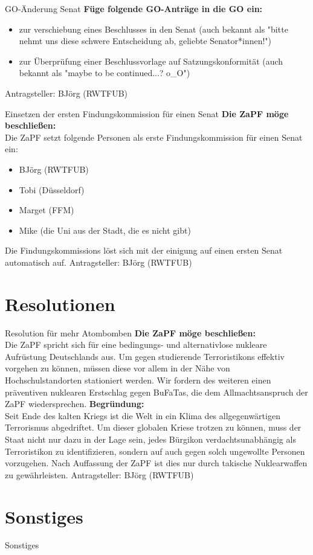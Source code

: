 \documentclass[compress,aspectratio=169]{beamer}
\begin{document}
\begin{frame}{GO-Änderung Senat}
	\textbf{Füge folgende GO-Anträge in die GO ein:}\\
	\begin{itemize}
		\item zur verschiebung eines Beschlusses in den Senat (auch bekannt
			als "bitte nehmt uns diese schwere Entscheidung ab, geliebte
			Senator*innen!")
		\item zur Überprüfung einer Beschlussvorlage auf Satzungskonformität
			(auch bekannt als "maybe to be continued...? o\_O")
	\end{itemize}
	\hfill Antragsteller: BJörg (RWTFUB)
\end{frame}

\begin{frame}{Einsetzen der ersten Findungskommission für einen Senat}
	\textbf{Die ZaPF möge beschließen:}\\
	Die ZaPF setzt folgende Personen als erste Findungskommission für einen
	Senat ein:
	\begin{itemize}
		\item BJörg (RWTFUB)
		\item Tobi (Düsseldorf)
		\item Marget (FFM)
		\item Mike (die Uni aus der Stadt, die es nicht gibt)
	\end{itemize}
	Die Findungskommissions löst sich mit der einigung auf einen ersten Senat
	automatisch auf.
	\hfill Antragsteller: BJörg (RWTFUB)
\end{frame}

\section{Resolutionen}
\begin{frame}{Resolution für mehr Atombomben}
	\textbf{Die ZaPF möge beschließen:}\\
	Die ZaPF spricht sich für eine bedingungs- und alternativlose nukleare
	Aufrüstung Deutschlands aus. Um gegen studierende Terroristikons effektiv
	vorgehen zu können, müssen diese vor allem in der Nähe von
	Hochschulstandorten stationiert werden. Wir fordern des weiteren einen
	präventiven nuklearen Erstschlag gegen BuFaTas, die dem Allmachtsanspruch
	der ZaPF wiedersprechen.
	\textbf{Begründung:}\\
	Seit Ende des kalten Kriegs ist die Welt in ein Klima des allgegenwärtigen
	Terrorismus abgedriftet. Um dieser globalen Kriese trotzen zu können, muss
	der Staat nicht nur dazu in der Lage sein, jedes Bürgikon
	verdachtsunabhängig als Terroristikon zu identifizieren, sondern auf auch
	gegen solch ungewollte Personen vorzugehen. Nach Auffassung der ZaPF ist
	dies nur durch takische Nuklearwaffen zu gewährleisten.
	\hfill Antragsteller: BJörg (RWTFUB)
\end{frame}

\section{Sonstiges}
\begin{frame}{Sonstiges}
\end{frame}
\end{document}

